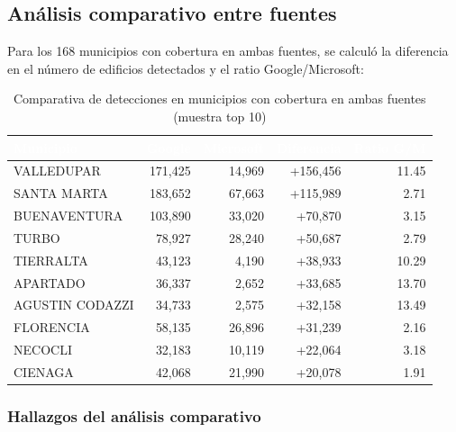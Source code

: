 \documentclass{article}
\newcommand{\tblhdr}[1]{%
  \cellcolor{azulclaro}\textbf{\textcolor{white}{#1}}%
}
\begin{document}
\subsection{Análisis comparativo entre fuentes}

Para los 168 municipios con cobertura en ambas fuentes, se calculó la diferencia en el número de edificios detectados y el ratio Google/Microsoft:

\begin{table}[H]
\centering
\caption{Comparativa de detecciones en municipios con cobertura en ambas fuentes (muestra top 10)}
\begin{tabular}{l r r r r}
\toprule
\tblhdr{Municipio} & \tblhdr{Google} & \tblhdr{Microsoft} & \tblhdr{Diferencia} & \tblhdr{Ratio G/M} \\
\midrule
VALLEDUPAR               & 171,425 & 14,969 & +156,456 & 11.45 \\
\rowcolor{grisfilas}
SANTA MARTA              & 183,652 & 67,663 & +115,989 & 2.71 \\
BUENAVENTURA             & 103,890 & 33,020 & +70,870  & 3.15 \\
\rowcolor{grisfilas}
TURBO                    & 78,927  & 28,240 & +50,687  & 2.79 \\
TIERRALTA                & 43,123  & 4,190  & +38,933  & 10.29 \\
\rowcolor{grisfilas}
APARTADO                 & 36,337  & 2,652  & +33,685  & 13.70 \\
AGUSTIN CODAZZI          & 34,733  & 2,575  & +32,158  & 13.49 \\
\rowcolor{grisfilas}
FLORENCIA                & 58,135  & 26,896 & +31,239  & 2.16 \\
NECOCLI                  & 32,183  & 10,119 & +22,064  & 3.18 \\
\rowcolor{grisfilas}
CIENAGA                  & 42,068  & 21,990 & +20,078  & 1.91 \\
\bottomrule
\end{tabular}
\end{table}

\subsubsection{Hallazgos del análisis comparativo}
\end{document}

